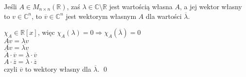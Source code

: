 \begin{ft} 
    Jeśli $A \in M_{n\times n}(\mathbb{R})$, zaś $\lambda \in \mathbb{C} \setminus \mathbb{R}$ jest 
    wartością własna $A$, a jej wektor własny to $v \in \mathbb{C}^n$, to $\overline{v} \in \mathbb{C}^n$ jest
    wektorym własnym $A$ dla wartości $\overline{\lambda}$.
\end{ft} 
\begin{dd} 
    $\chi_A \in \mathbb{R}[x]$, więc $\chi_A (\lambda ) = 0 \Rightarrow \chi_A(\overline{\lambda}) = 0$ \\ 
    $Av = \lambda v$ \\ 
    $\overline{Av} = \overline{\lambda v}$ \\ 
    $\overline{A} \cdot \overline{v} = \overline{\lambda} \cdot \overline{v} $ \\ 
    $ A \cdot \overline{z} = \overline{\lambda} \cdot \overline{z}$ \\ 
    czyli $\overline{v}$ to wektory własny dla $\overline{\lambda}$. \hfill \qed
\end{dd} 
